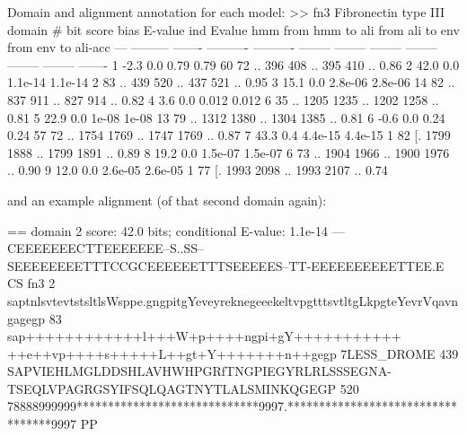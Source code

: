 \begin{sreoutput}
Domain and alignment annotation for each model:
>> fn3  Fibronectin type III domain
     # bit score    bias    E-value ind Evalue hmm from   hmm to    ali from   ali to    env from   env to    ali-acc
   --- --------- ------- ---------- ---------- -------- --------    -------- --------    -------- --------    -------
     1      -2.3     0.0       0.79       0.79       60       72 ..      396      408 ..      395      410 ..    0.86
     2      42.0     0.0    1.1e-14    1.1e-14        2       83 ..      439      520 ..      437      521 ..    0.95
     3      15.1     0.0    2.8e-06    2.8e-06       14       82 ..      837      911 ..      827      914 ..    0.82
     4       3.6     0.0      0.012      0.012        6       35 ..     1205     1235 ..     1202     1258 ..    0.81
     5      22.9     0.0      1e-08      1e-08       13       79 ..     1312     1380 ..     1304     1385 ..    0.81
     6      -0.6     0.0       0.24       0.24       57       72 ..     1754     1769 ..     1747     1769 ..    0.87
     7      43.3     0.4    4.4e-15    4.4e-15        1       82 [.     1799     1888 ..     1799     1891 ..    0.89
     8      19.2     0.0    1.5e-07    1.5e-07        6       73 ..     1904     1966 ..     1900     1976 ..    0.90
     9      12.0     0.0    2.6e-05    2.6e-05        1       77 [.     1993     2098 ..     1993     2107 ..    0.74
\end{sreoutput}

and an example alignment (of that second domain again):

\begin{sreoutput}
  == domain 2    score: 42.0 bits;  conditional E-value: 1.1e-14
                  ---CEEEEEEECTTEEEEEEE--S..SS--SEEEEEEEETTTCCGCEEEEEETTTSEEEEES--TT-EEEEEEEEEETTEE.E CS
          fn3   2 saptnlsvtevtstsltlsWsppe.gngpitgYeveyreknegeeekeltvpgtttsvtltgLkpgteYevrVqavngagegp 83
                  sap++++++++++++l+++W+p++++ngpi+gY+++++++++++ ++e++vp++++s+++++L++gt+Y+++++++n++gegp
  7LESS_DROME 439 SAPVIEHLMGLDDSHLAVHWHPGRfTNGPIEGYRLRLSSSEGNA-TSEQLVPAGRGSYIFSQLQAGTNYTLALSMINKQGEGP 520
                  78888999999*****************************9997.**********************************9997 PP
\end{sreoutput}

